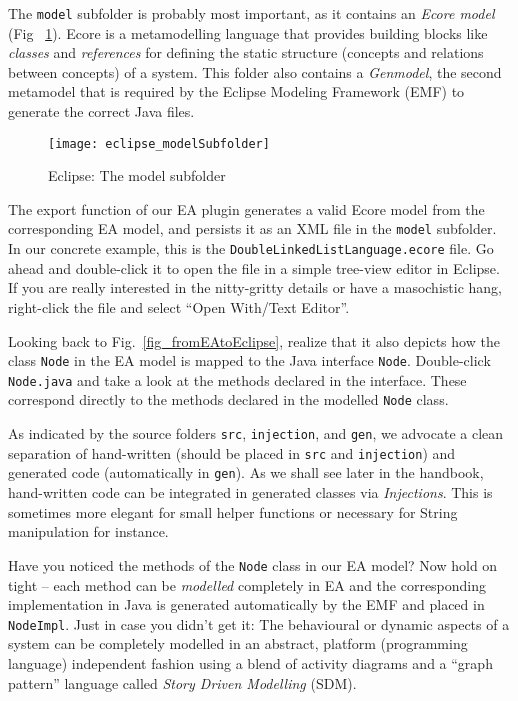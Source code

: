 The  \texttt{model} subfolder is probably most important, as it contains an  \emph{Ecore model} (Fig ~\ref{fig_modelSubfolder}). Ecore is a metamodelling
language that provides building  blocks like \emph{classes} and \emph{references} for defining the  static structure (concepts and relations between concepts)
of a system. This folder also contains a \emph{Genmodel}, the second metamodel that is required by the Eclipse Modeling Framework (EMF) to generate the correct
Java files.

\begin{figure}[htbp]
	\centering
  \texttt{[image: eclipse\_modelSubfolder]}
	\caption{Eclipse: The model subfolder}
	\label{fig_modelSubfolder}
\end{figure}

The  export function of our EA plugin generates a valid Ecore model from the  corresponding EA model, and persists it as an XML file in the \texttt{model}
subfolder. In our concrete example, this is the \texttt{DoubleLinkedListLanguage.ecore} file. Go ahead and double-click it to open the file in a simple
tree-view editor in Eclipse. If you are really interested in the nitty-gritty details or have a masochistic hang, right-click the file and select ``Open
With/Text Editor''.

Looking back to Fig.~\ref{fig_fromEAtoEclipse}, realize that it also depicts how the class \texttt{Node} in the EA model is mapped to the Java interface
\texttt{Node}. Double-click \texttt{Node.java} and take a look at the methods declared in the interface. These correspond directly to the methods declared in
the modelled \texttt{Node} class.

As indicated by the source folders \texttt{src}, \texttt{injection}, and \texttt{gen}, we advocate a clean separation of hand-written (should be placed in
\texttt{src} and \texttt{injection}) and generated code (automatically in \texttt{gen}). As we shall see later in the handbook, hand-written code can be
integrated in generated classes via \emph{Injections}.
This is sometimes more elegant for small helper functions or necessary for String manipulation for instance.

Have you noticed the methods of the \texttt{Node} class in our EA model?  Now hold on tight -- each method can be \emph{modelled} completely in EA and the
corresponding implementation in Java is generated automatically by the EMF and placed in \texttt{NodeImpl}.
Just in case you didn't get it: The behavioural or dynamic aspects of a system can be completely modelled in an abstract, platform (programming language)
independent fashion using a blend of activity  diagrams and a ``graph pattern'' language called \textit{Story Driven Modelling} (SDM).

